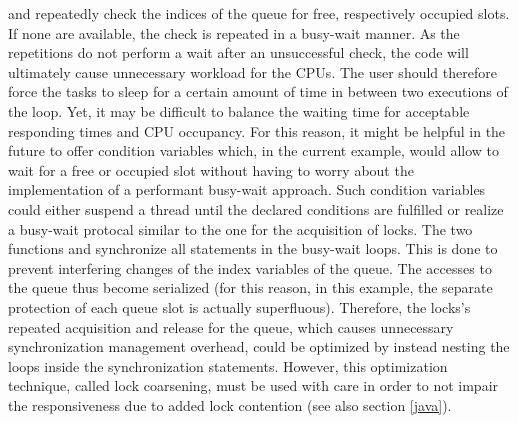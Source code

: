  and  repeatedly check the indices of the queue for free, respectively occupied slots. If none are available, the check is repeated in a busy-wait manner. As the repetitions do not perform a wait after an unsuccessful check, the code will ultimately cause unnecessary workload for the CPUs. The user should therefore force the tasks to sleep for a certain amount of time in between two executions of the loop. Yet, it may be difficult to balance the waiting time for acceptable responding times and CPU occupancy. For this reason, it might be helpful in the future to offer condition variables which, in the current example, would allow  to wait for a free or occupied slot without having to worry about the implementation of a performant busy-wait approach. Such condition variables could either suspend a thread until the declared conditions are fulfilled or realize a busy-wait protocal similar to the one for the acquisition of locks. The two functions  and  synchronize all statements in the busy-wait loops. This is done to prevent interfering changes of the index variables of the queue. The accesses to the queue thus become serialized (for this reason, in this example, the separate protection of each queue slot is actually superfluous). Therefore, the locks's repeated acquisition and release for the queue, which causes unnecessary synchronization management overhead, could be optimized by instead nesting the loops inside the synchronization statements. However, this optimization technique, called lock coarsening, must be used with care in order to not impair the responsiveness due to added lock contention (see also section \ref{java}).

